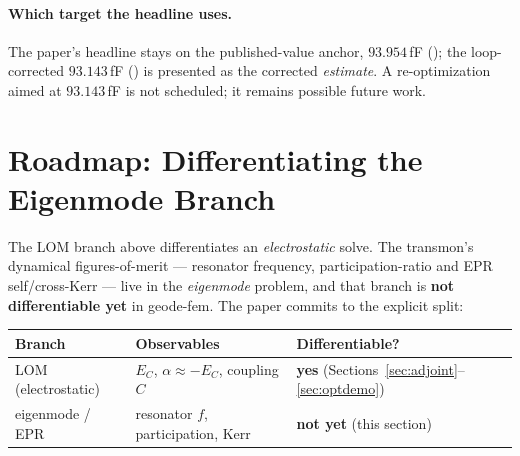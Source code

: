 \documentclass{anvil-paper}
\begin{document}
\paragraph{Which target the headline uses.}
The paper's headline stays on the published-value anchor,
$93.954$\,fF (); the
loop-corrected $93.143$\,fF () is
presented as the corrected \emph{estimate}. A re-optimization aimed at
$93.143$\,fF is not scheduled; it remains possible future work.

\section{Roadmap: Differentiating the Eigenmode Branch}
\label{sec:roadmap}

The LOM branch above differentiates an \emph{electrostatic} solve. The
transmon's dynamical figures-of-merit --- resonator frequency,
participation-ratio and EPR self/cross-Kerr \citep{minev2021,nigg2012}
--- live in the \emph{eigenmode} problem, and that branch is \textbf{not
differentiable yet} in geode-fem. The paper commits to the explicit
split:

\begin{table}[h]
  \centering
  \small
  \begin{tabular}{@{}lll@{}}
    \toprule
    Branch & Observables & Differentiable? \\
    \midrule
    LOM (electrostatic) & $E_C$, $\alpha \approx -E_C$, coupling $C$ &
      \textbf{yes} (Sections~\ref{sec:adjoint}--\ref{sec:optdemo}) \\
    eigenmode / EPR & resonator $f$, participation, Kerr &
      \textbf{not yet} (this section) \\
    \bottomrule
  \end{tabular}
\end{table}
\end{document}
